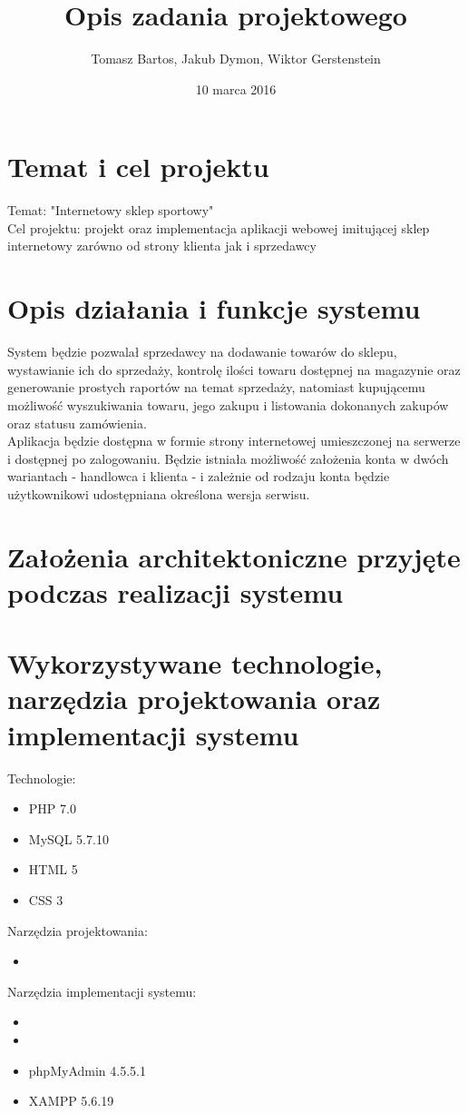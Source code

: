 \documentclass[a4paper, 11pt]{article}
\title{Opis zadania projektowego}
\author{Tomasz Bartos, Jakub Dymon, Wiktor Gerstenstein}
\date{10 marca 2016}
\begin{document}
\maketitle
\section{Temat i cel projektu}
Temat: "Internetowy sklep sportowy"\\
Cel projektu: projekt oraz implementacja aplikacji webowej imitującej sklep internetowy zarówno od strony klienta jak i sprzedawcy
\section{Opis działania i funkcje systemu}
System będzie pozwalał sprzedawcy na dodawanie towarów do sklepu, wystawianie ich do sprzedaży, kontrolę ilości towaru dostępnej na magazynie oraz generowanie prostych raportów na temat sprzedaży, natomiast kupującemu możliwość wyszukiwania towaru, jego zakupu i listowania dokonanych zakupów oraz statusu zamówienia.\\
Aplikacja będzie dostępna w formie strony internetowej umieszczonej na serwerze i dostępnej po zalogowaniu. Będzie istniała możliwość założenia konta w dwóch wariantach - handlowca i klienta - i zależnie od rodzaju konta będzie użytkownikowi udostępniana określona wersja serwisu.
\section{Założenia architektoniczne przyjęte podczas realizacji systemu}
\section{Wykorzystywane technologie, narzędzia projektowania oraz implementacji systemu}
Technologie:
\begin{itemize}
	\item PHP 7.0
	\item MySQL 5.7.10
	\item HTML 5
	\item CSS 3
\end{itemize}
Narzędzia projektowania:
\begin{itemize}
	\item %
\end{itemize}
Narzędzia implementacji systemu:
\begin{itemize}
	\item %
	\item %
	\item phpMyAdmin 4.5.5.1 %
	\item XAMPP 5.6.19 %
\end{itemize}
\end{document}
